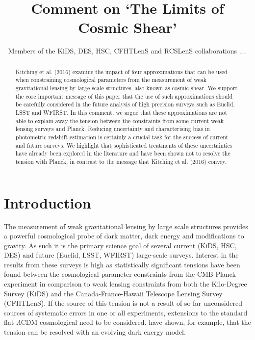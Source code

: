 \documentclass[preprint]{aastex}
\begin{document}
\title{\huge{Comment on `The Limits of Cosmic Shear'}}

\author{Members of the KiDS, DES, HSC, CFHTLenS and RCSLenS collaborations ....}


\begin{abstract}
Kitching et al. (2016) examine the impact of four approximations that can be used when constraining cosmological parameters from the measurement of weak gravitational lensing by large-scale structures, also known as cosmic shear.  We support the core important message of this paper that the use of such approximations should be carefully considered in the future analysis of high precision surveys such as Euclid, LSST and WFIRST.  In this comment, we argue that these approximations are not able to explain away the tension between the constraints from some current weak lensing surveys and Planck.  Reducing uncertainty and characterising bias in photometric redshift estimation is certainly a crucial task for the success of current and future surveys.  We highlight that sophisticated treatments of these uncertainties have already been explored in the literature and have been shown not to resolve the tension with Planck, in contrast to the message that Kitching et al. (2016) convey.

\end{abstract}
\section{Introduction}

The measurement of weak gravitational lensing by large scale structures provides a powerful cosmological probe of dark matter, dark energy and modifications to gravity.  As such it is the primary science goal of several current (KiDS, HSC, DES) and future (Euclid, LSST, WFIRST) large-scale surveys.   Interest in the results from these surveys is high as statistically significant tensions have been found between the cosmological parameter constraints from the CMB Planck experiment \citep{planck/cosmo:2015} in comparison to weak lensing constraints from both the Kilo-Degree Survey (KiDS) and the Canada-France-Hawaii Telescope Lensing Survey (CFHTLenS).  If the source of this tension is not a result of so-far unconsidered sources of systematic errors in one or all experiments, extensions to the standard flat $\Lambda$CDM cosmological need to be considered.  \citet{joudaki/etal:2017} have shown, for example, that the tension can be resolved with an evolving dark energy model.
\end{document}
